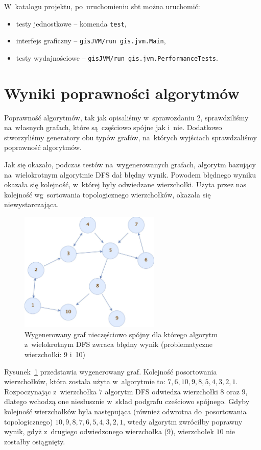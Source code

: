 \documentclass[a4paper,12pt]{mwart}
\begin{document}
W~katalogu projektu, po~uruchomieniu sbt można uruchomić:
\begin{itemize}
\item testy jednostkowe -- komenda \verb+test+,
\item interfejs graficzny -- \verb+gisJVM/run gis.jvm.Main+,
\item testy wydajnościowe -- \verb+gisJVM/run gis.jvm.PerformanceTests+.
\end{itemize}

\section{Wyniki poprawności algorytmów}

Poprawność algorytmów, tak jak opisaliśmy w~sprawozdaniu 2, sprawdziliśmy
na~własnych grafach, które są~częściowo spójne jak i~nie. Dodatkowo
stworzyliśmy generatory obu typów grafów, na~których wyjściach sprawdzaliśmy
poprawność algorytmów.

Jak się okazało, podczas testów na~wygenerowanych grafach, algorytm bazujący
na~wielokrotnym algorytmie DFS dał błędny wynik. Powodem błędnego wyniku
okazała się kolejność, w~której były odwiedzane wierzchołki. Użyta przez nas
kolejność wg~sortowania topologicznego wierzchołków, okazała się
niewystarczająca.

\begin{figure}[htpb]
\centering
\includegraphics[width=0.6\textwidth]{generated-tricky-graph.jpg}
\caption{Wygenerowany graf nieczęściowo spójny dla którego algorytm
  z~wielokrotnym DFS zwraca błędny wynik (problematyczne wierzchołki: 9 i~10)}
\label{fig:tricky-graph}
\end{figure}

Rysunek~\ref{fig:tricky-graph} przedstawia wygenerowany graf. Kolejność
posortowania wierzchołków, która została użyta w~algorytmie to:
$7, 6, 10, 9, 8, 5, 4, 3, 2, 1$. Rozpoczynając z~wierzchołka $7$ algorytm DFS
odwiedza wierzchołki $8$ oraz $9$, dlatego wchodzą one niesłusznie w~skład
podgrafu cześciowo spójnego. Gdyby kolejność wierzchołków była następująca
(również odwrotna do~posortowania topologicznego)
$10, 9, 8, 7, 6, 5, 4, 3, 2, 1$, wtedy algorytm zwróciłby poprawny wynik, gdyż
z~drugiego odwiedzonego wierzchołka ($9$), wierzchołek $10$ nie zostałby
osiągnięty.
\end{document}
